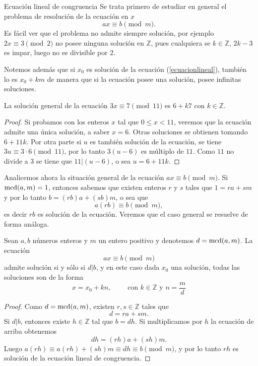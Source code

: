 \begin{section}{Ecuación lineal de congruencia}\label{seccion-ecuacion-lineal-de-congruencia}
Se trata primero de estudiar en general el problema de resolución de la ecuación en $x$
\begin{equation}\label{ecuacionlineal}
 ax \equiv b \pmod{m}.
\end{equation}
Es fácil ver que el problema no admite siempre solución, por ejemplo $2x\equiv 3 \pmod{2}$ no posee ninguna solución en $\mathbb Z$, pues cualquiera se $k \in \mathbb Z$, $2k-3$ es impar, luego no es divisible por $2$.

Notemos además que si $x_0$ es solución de la ecuación (\ref{ecuacionlineal}), también lo es $x_0+km$ de manera que si la ecuación posee una solución, posee infinitas soluciones. 

\begin{ejemplo*} La solución general de la ecuación $3x\equiv 7 \pmod{11}$ es $6+k7$ con $k \in \mathbb Z$.
\end{ejemplo*}
\begin{proof} Si probamos con los enteros $x$ tal que  $0\le x < 11$, veremos que la ecuación admite una única solución, a saber $x=6$. Otras soluciones se obtienen tomando $6+11k$. Por otra parte si $u$ es también solución de la ecuación, se tiene $3u \equiv 3\cdot 6 \pmod{11}$, por lo tanto $3(u-6)$ es múltiplo de $11$. Como $11$ no divide a $3$ se tiene que $11|(u-6)$, o sea $u=6+11k$.
\end{proof}

Analicemos ahora la situación general de la ecuación $ ax\equiv b
\pmod{m}$. Si $\operatorname{mcd}(a,m)=1$, entonces sabemos que existen enteros
$r$ y $s$ tales que $1=ra+sm$ y por lo tanto $b=(rb)a +(sb)m$, o
sea que
$$
a(rb) \equiv b \pmod{m},
$$
es decir $rb$ es solución de la ecuación. Veremos que el caso general se resuelve de forma análoga.

\begin{teorema}\label{teorema-elc} Sean $a,b$ números enteros y $m$ un entero positivo y denotemos $d = \operatorname{mcd}(a,m)$. La  ecuación 
\begin{equation}\label{ecu.elc}
ax \equiv b \pmod{m}
\end{equation}
admite solución si y sólo si $d|b$, y en este caso dada $x_0$ una solución, todas las soluciones son de la forma 
$$x = x_0 + k n,\qquad \mbox{ con } k \in \mathbb Z \mbox{ y } n = {\frac{m}{d}} $$
\end{teorema}
\begin{proof} Como $d =\operatorname{mcd}(a,m)$, existen $r,s \in \mathbb Z$ tales que
$$
d = ra+sm.
$$
Si $d|b$, entonces existe $h\in \mathbb Z$ tal que $b = dh$. Si multiplicamos por $h$ la ecuación de arriba obtenemos
$$
dh = (rh)a+(sh)m.
$$
Luego $a(rh) \equiv a(rh)+(sh)m \equiv dh \equiv b \pmod{m}$, y por lo tanto $rh$ es solución de la ecuación lineal de congruencia.    



\end{proof}
\end{section}
